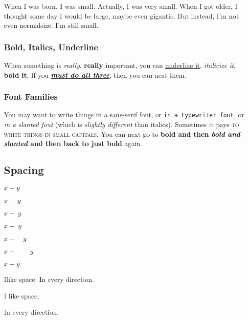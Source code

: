 \documentclass{article}
\begin{document}
When I was born, I was {\small small}. Actually, {\scriptsize I was
very small}. When I got older, I thought some day {\Large I would be
large}, {\Huge maybe even gigantic}. But instead, I'm not even
normalsize. {\small I'm still small.}

\subsubsection{Bold, Italics, Underline}

When something is \emph{really}, \textbf{really} important, you can
\underline{underline it}, \emph{italicize it}, \textbf{bold it}. If
you \underline{\textbf{\emph{must do all three}}}, then you can nest
them.

\subsubsection{Font Families}

You may want to write things \textsf{in a sans-serif font}, or
\texttt{in a typewriter font}, or \textsl{in a slanted font} (which
is \emph{slightly different} than italics). Sometimes it pays
\textsc{to write things in small capitals}. You can next go to
\textbf{bold and then \textsl{bold and slanted} and then back to just
bold} again.

\subsection{Spacing}

$x+y$

$x+\,y$

$x+\:y$

$x+\;y$

$x+\quad y$

$x+\qquad y$

$x+\!y$

I\hfill like \hfill space.
\vfill
In every direction.

I \hspace{2in} like \hspace{1in} space.

\vspace{5in}

In every direction.
\end{document}
